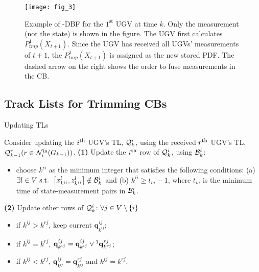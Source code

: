 	\begin{figure}%
		\centering
		\texttt{[image: fig\_3]}%
		\caption{Example of \proto-DBF for the $1^\text{st}$ UGV at time $k$. 
			Only the measurement (not the state) is shown in the figure.
			The UGV first calculates $ P^1_{tmp}(X_{t+1})$. 
			Since the UGV has received all UGVs' measurements of $t+1$, the $ P^1_{tmp}(X_{t+1})$ is assigned as the new stored PDF. 
			The dashed arrow on the right shows the order to fuse measurements in the CB.}
		\label{fig:LIFO-DBF}
	\end{figure}			
	
	\subsection{Track Lists for Trimming CBs}\label{subsec:tracklist}
	
	\begin{algorithm}
		\caption{Updating TLs}
		\label{alg:upd_tl}
		\begin{algorithmic}
			\State Consider updating the $i^\text{th}$ UGV's TL, $\mathcal{Q}^i_k$, using the received $r^\text{th}$ UGV's TL, $\mathcal{Q}^r_{k-1}(r\in \mathcal{N}^\text{in}_i(G_{k-1}))$.		
			\State \textbf{(1)} Update the $i^\text{th}$ row of $\mathcal{Q}^i_k$, using $\mathcal{B}^i_k$:
			\begin{itemize}
				\item choose $k^{ii}$ as the minimum integer that satisfies the following conditions: (a) $\exists l\in V \text{ s.t. } \left[x^l_{k^{ii}},z^l_{k^{ii}}\right]\notin \mathcal{B}^i_k$ and (b) $k^{ii} \ge t_m-1$, where $t_m$ is the minimum time of state-measurement pairs in $\mathcal{B}^i_k$.
			\end{itemize}
			\State \textbf{(2)} Update other rows of $\mathcal{Q}^i_k$:
			$\forall j\in V\setminus\left\lbrace i\right\rbrace$
			\begin{itemize} 
				\item if $k^{ij}>k^{rj}$, keep current $\mathbf{q}^{ij}_{k^{ij}}$;
				\item if $k^{ij}=k^{rj}$, $\mathbf{q}^{ij}_{k^{ij}}=\mathbf{q}^{ij}_{k^{ij}} \lor\footnotemark\mathbf{q}^{rj}_{k^{rj}}$; 
				\item if $k^{ij}<k^{rj}$, $\mathbf{q}^{ij}_{k^{ij}}=\mathbf{q}^{rj}_{k^{rj}}$ and $k^{ij}=k^{rj}$.
			\end{itemize}
		\end{algorithmic}
	\end{algorithm}
		

